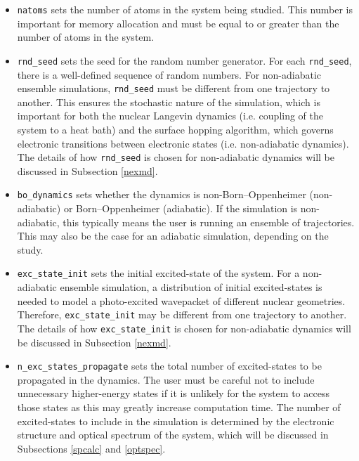\documentclass[letterpaper,12pt,titlepage]{article}
\begin{document}
\begin{itemize}
\item \verb+natoms+ sets the number of atoms in the system being studied.  This number is important for memory allocation and must be equal to or greater than the number of atoms in the system.
\item \verb+rnd_seed+ sets the seed for the random number generator.  For each \verb+rnd_seed+, there is a well-defined sequence of random numbers.  For non-adiabatic ensemble simulations, \verb+rnd_seed+ must be different from one trajectory to another.  This ensures the stochastic nature of the simulation, which is important for both the nuclear Langevin dynamics (i.e. coupling of the system to a heat bath) and the surface hopping algorithm,\cite{tully1990molecular} which governs electronic transitions between electronic states (i.e. non-adiabatic dynamics).  The details of how \verb+rnd_seed+ is chosen for non-adiabatic dynamics will be discussed in Subsection \ref{nexmd}. 
\item \verb+bo_dynamics+ sets whether the dynamics is non-Born--Oppenheimer (non-adiabatic) or Born--Oppenheimer (adiabatic).  If the simulation is non-adiabatic, this typically means the user is running an ensemble of trajectories.  This may also be the case for an adiabatic simulation, depending on the study.
\item \verb+exc_state_init+ sets the initial excited-state of the system.  For a non-adiabatic ensemble simulation, a distribution of initial excited-states is needed to model a photo-excited wavepacket of different nuclear geometries.  Therefore, \verb+exc_state_init+ may be different from one trajectory to another.  The details of how \verb+exc_state_init+ is chosen for non-adiabatic dynamics will be discussed in Subsection \ref{nexmd}. 
\item \verb+n_exc_states_propagate+ sets the total number of excited-states to be propagated in the dynamics.  The user must be careful not to include unnecessary higher-energy states if it is unlikely for the system to access those states as this may greatly increase computation time.  The number of excited-states to include in the simulation is determined by the electronic structure and optical spectrum of the system, which will be discussed in Subsections \ref{spcalc} and \ref{optspec}.
\end{itemize}
\end{document}
